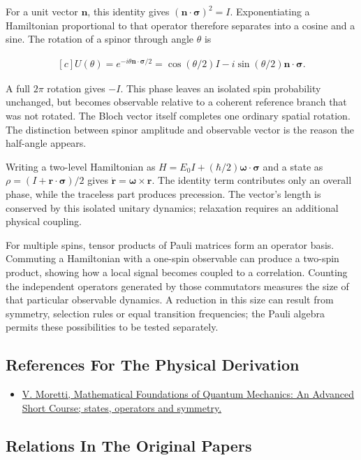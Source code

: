 \documentclass[11pt,oneside]{book}
\newenvironment{centeredalign}{\[\begin{gathered}[c]}{\end{gathered}\]}
\begin{document}
For a unit vector \(\mathbf n\), this identity gives \((\mathbf n\cdot\boldsymbol\sigma)^2=I\). Exponentiating a Hamiltonian proportional to that operator therefore separates into a cosine and a sine. The rotation of a spinor through angle \(\theta\) is

\begin{centeredalign}
U(\theta)=e^{-i\theta\mathbf n\cdot\boldsymbol\sigma/2}
=\cos(\theta/2)I-i\sin(\theta/2)\mathbf n\cdot\boldsymbol\sigma.
\end{centeredalign}

A full \(2\pi\) rotation gives \(-I\). This phase leaves an isolated spin probability unchanged, but becomes observable relative to a coherent reference branch that was not rotated. The Bloch vector itself completes one ordinary spatial rotation. The distinction between spinor amplitude and observable vector is the reason the half-angle appears.

Writing a two-level Hamiltonian as \(H=E_0I+(\hbar/2)\boldsymbol\omega\cdot\boldsymbol\sigma\) and a state as \(\rho=(I+\mathbf r\cdot\boldsymbol\sigma)/2\) gives \(\dot{\mathbf r}=\boldsymbol\omega\times\mathbf r\). The identity term contributes only an overall phase, while the traceless part produces precession. The vector's length is conserved by this isolated unitary dynamics; relaxation requires an additional physical coupling.

For multiple spins, tensor products of Pauli matrices form an operator basis. Commuting a Hamiltonian with a one-spin observable can produce a two-spin product, showing how a local signal becomes coupled to a correlation. Counting the independent operators generated by those commutators measures the size of that particular observable dynamics. A reduction in this size can result from symmetry, selection rules or equal transition frequencies; the Pauli algebra permits these possibilities to be tested separately.

\subsection*{References For The Physical Derivation}
\begin{itemize}
\item \href{https://arxiv.org/abs/1508.06951}{V. Moretti, Mathematical Foundations of Quantum Mechanics: An Advanced Short Course; states, operators and symmetry.}
\end{itemize}

\subsection*{Relations In The Original Papers}
\end{document}
